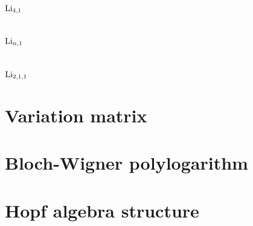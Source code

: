 \documentclass[main]{subfiles}
\begin{document}
\section{$\operatorname{Li}_{4,1}$}

\newpage

\section{$\operatorname{Li}_{n,1}$}

\newpage

\section{$\operatorname{Li}_{2,1,1}$}

\newpage

\section{Variation matrix}

\newpage

\section{Bloch-Wigner polylogarithm}

\newpage

\section{Hopf algebra structure}

\newpage
\end{document}
